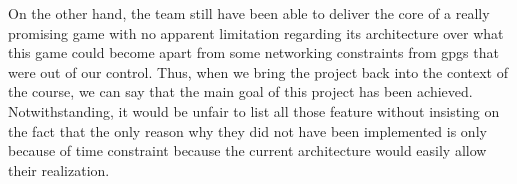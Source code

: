 On the other hand, the team still have been able to deliver the core of a really promising game with no apparent limitation regarding its architecture over what this game could become apart from some networking constraints from \gls{gpgs} that were out of our control. Thus, when we bring the project back into the context of the course, we can say that the main goal of this project has been achieved. Notwithstanding, it would be unfair to list all those feature without insisting on the fact that the only reason why they did not have been implemented is only because of time constraint because the current architecture would easily allow their realization.
